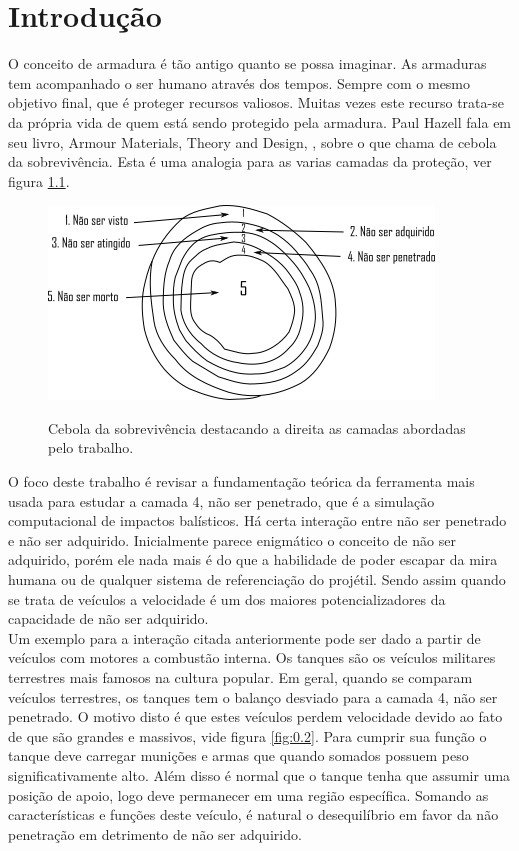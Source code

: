 \chapter{Introdução}

 O conceito de armadura é tão antigo quanto se possa imaginar. As armaduras tem acompanhado o ser humano através dos tempos. Sempre com o mesmo objetivo final, que é proteger recursos valiosos. Muitas vezes este recurso trata-se da própria vida de quem está sendo protegido pela armadura. Paul Hazell fala em seu livro, Armour Materials, Theory and Design, \cite{Hazell}, sobre o que chama de cebola da sobrevivência. Esta é uma analogia para as varias camadas da proteção, ver figura \ref{fig:0.1}.\\
 
 \begin{figure}[h]
 	\caption{Cebola da sobrevivência destacando a direita as camadas abordadas pelo trabalho.}
 	\centering
 	\includegraphics{images/cebola_sobrevive}
 	\label{fig:0.1}
 \end{figure}
O foco deste trabalho é revisar a fundamentação teórica da ferramenta mais usada para estudar a camada 4, não ser penetrado, que é a simulação computacional de impactos balísticos. Há certa interação entre não ser penetrado e não ser adquirido. Inicialmente parece enigmático o conceito de não ser adquirido, porém ele nada mais é do que a habilidade de poder escapar da mira humana ou de qualquer sistema de referenciação do projétil. Sendo assim quando se trata de veículos a velocidade é um dos maiores potencializadores da capacidade de não ser adquirido. \\

Um exemplo para a interação citada anteriormente pode ser dado a partir de veículos com motores a combustão interna. Os tanques são os veículos militares terrestres mais famosos na cultura popular. Em geral, quando se comparam veículos terrestres, os tanques tem o balanço desviado para a camada 4, não ser penetrado. O motivo disto é que estes veículos perdem velocidade devido ao fato de que são grandes e massivos, vide figura \ref{fig:0.2}. Para cumprir sua função o tanque deve carregar munições e armas que quando somados possuem peso significativamente alto. Além disso é normal que o tanque tenha que assumir uma posição de apoio, logo deve permanecer em uma região específica. Somando as características e funções deste veículo, é natural o desequilíbrio em favor da não penetração em detrimento de não ser adquirido.\\ 

